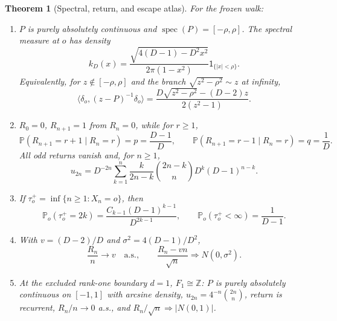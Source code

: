 \documentclass[10pt]{article}
\newtheorem{theorem}{Theorem}
\theoremstyle{remark}
\newcommand{\Pp}{\mathbb P}
\newcommand{\1}{\mathsf{1}}
\newcommand{\spec}{\operatorname{spec}}
\begin{document}
\begin{theorem}[Spectral, return, and escape atlas]\label{thm:main}
For the frozen walk:
\begin{enumerate}[label=\textup{(\roman*)}]
\item $P$ is purely absolutely continuous and
$\spec(P)=[-\rho,\rho]$.  The spectral measure at $o$ has density
\begin{equation}
 k_D(x)=\frac{\sqrt{4(D-1)-D^2x^2}}{2\pi(1-x^2)}
 \1_{\{|x|<\rho\}}.                                      \label{eq:density}
\end{equation}
Equivalently, for $z\notin[-\rho,\rho]$ and the branch
$\sqrt{z^2-\rho^2}\sim z$ at infinity,
\begin{equation}
 \langle\delta_o,(z-P)^{-1}\delta_o\rangle
 =\frac{D\sqrt{z^2-\rho^2}-(D-2)z}{2(z^2-1)}.             \label{eq:resolvent}
\end{equation}
\item $R_0=0$, $R_{n+1}=1$ from $R_n=0$, while for $r\ge1$,
\begin{equation}
 \Pp(R_{n+1}=r+1\mid R_n=r)=p=\frac{D-1}{D},\qquad
 \Pp(R_{n+1}=r-1\mid R_n=r)=q=\frac1D.                   \label{eq:radial}
\end{equation}
All odd returns vanish and, for $n\ge1$,
\begin{equation}
 u_{2n}=D^{-2n}\sum_{k=1}^{n}
 \frac{k}{2n-k}\binom{2n-k}{n}D^k(D-1)^{n-k}.             \label{eq:returns}
\end{equation}
\item If $\tau_o^+=\inf\{n\ge1:X_n=o\}$, then
\begin{equation}
 \Pp_o(\tau_o^+=2k)=\frac{C_{k-1}(D-1)^{k-1}}{D^{2k-1}},
 \qquad \Pp_o(\tau_o^+<\infty)=\frac1{D-1}.               \label{eq:firstreturn}
\end{equation}
\item With $v=(D-2)/D$ and $\sigma^2=4(D-1)/D^2$,
\begin{equation}
 \frac{R_n}{n}\longrightarrow v\quad\text{a.s.},\qquad
 \frac{R_n-vn}{\sqrt n}\Longrightarrow N(0,\sigma^2).     \label{eq:escape}
\end{equation}
\item At the excluded rank-one boundary $d=1$, $F_1\cong\mathbb Z$:
$P$ is purely absolutely continuous on $[-1,1]$ with arcsine density,
$u_{2n}=4^{-n}\binom{2n}{n}$, return is recurrent,
$R_n/n\to0$ a.s., and $R_n/\sqrt n\Rightarrow |N(0,1)|$.
\end{enumerate}
\end{theorem}
\end{document}
